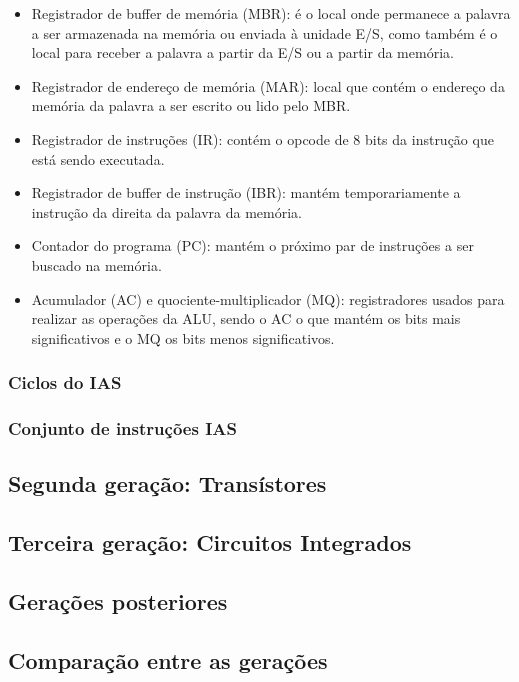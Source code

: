 \documentclass{article}
\begin{document}
\begin{itemize}
        \item Registrador de buffer de memória (MBR): é o local onde permanece
            a palavra a ser armazenada na memória ou enviada à unidade E/S,
            como também é o local para receber a palavra a partir da E/S ou a
            partir da memória.
        \item Registrador de endereço de memória (MAR): local que contém o
            endereço da memória da palavra a ser escrito ou lido pelo MBR.
        \item Registrador de instruções (IR): contém o opcode de 8 bits da
            instrução que está sendo executada.
        \item Registrador de buffer de instrução (IBR): mantém temporariamente
            a instrução da direita da palavra da memória.
        \item Contador do programa (PC): mantém o próximo par de instruções a
            ser buscado na memória.
        \item Acumulador (AC) e quociente-multiplicador (MQ): registradores
            usados para realizar as operações da ALU, sendo o AC o que mantém
            os bits mais significativos e o MQ os bits menos significativos.
\end{itemize}

\subsubsection{Ciclos do IAS}
\subsubsection{Conjunto de instruções IAS}
\subsection{Segunda geração: Transístores}
\subsection{Terceira geração: Circuitos Integrados}
\subsection{Gerações posteriores}
\subsection{Comparação entre as gerações}
\end{document}
